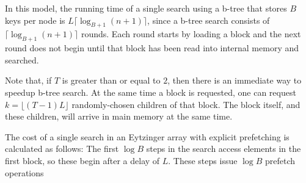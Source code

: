 \documentclass{patmorin}
\begin{document}
In this model, the running time of a single search using a b-tree that
stores $B$ keys per node is $L\lceil\log_{B+1}(n+1)\rceil$, since a
b-tree search consists of $\lceil\log_{B+1}(n+1)\rceil$ rounds. Each
round starts by loading a block and the next round does not begin until
that block has been read into internal memory and searched.

Note that, if $T$ is greater than or equal to $2$, then there is an
immediate way to speedup b-tree search. At the same time a block is
requested, one can request $k=\lfloor (T-1)L\rfloor$ randomly-chosen
children of that block.  The block itself, and these children, will
arrive in main memory at the same time.  

The cost of a single search in an Eytzinger array with explicit
prefetching is calculated as follows:  The first $\log B$ steps in the
search access elements in the first block, so these begin after a delay
of $L$. These steps issue $\log B$ prefetch operations
\end{document}
